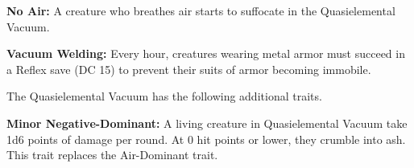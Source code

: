 \textbf{No Air:} A creature who breathes air starts to suffocate in the Quasielemental Vacuum.

\textbf{Vacuum Welding:} Every hour, creatures wearing metal armor must succeed in a Reflex save (DC 15) to prevent their suits of armor becoming immobile.

The Quasielemental Vacuum has the following additional traits.
\begin{itemize*}
\item \textbf{Minor Negative-Dominant:} A living creature in Quasielemental Vacuum take 1d6 points of damage per round. At 0 hit points or lower, they crumble into ash.\\

This trait replaces the Air-Dominant trait.
\end{itemize*}
